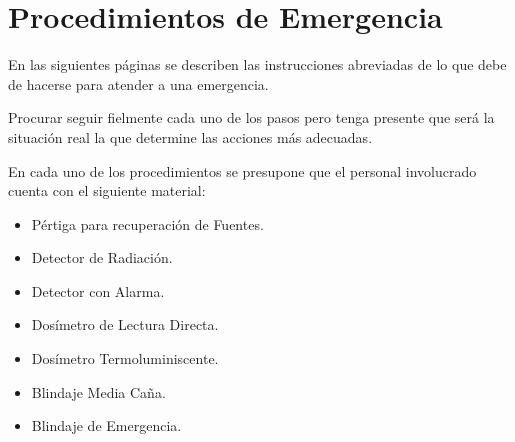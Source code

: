 \chapter{Procedimientos de Emergencia}

En las siguientes páginas se describen las instrucciones abreviadas de lo que debe de hacerse para atender a una emergencia. 

Procurar seguir fielmente cada uno de los pasos pero tenga presente que será la situación real la que determine las acciones más adecuadas.

En cada uno de los procedimientos se presupone que el personal involucrado cuenta con el siguiente material:
\begin{itemize}
    \item Pértiga para recuperación de Fuentes.
    \item Detector de Radiación.
    \item Detector con Alarma.
    \item Dosímetro de Lectura Directa.
    \item Dosímetro Termoluminiscente.
    \item Blindaje Media Caña.
    \item Blindaje de Emergencia.
\end{itemize}
